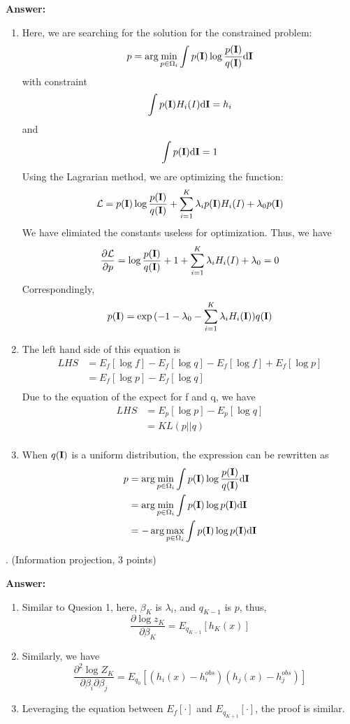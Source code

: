 \documentclass[11pt]{article}
\newcommand{\I}{{\bf I}}
\begin{document}
\textbf{Answer:}
\begin{enumerate}
    \item 
    Here, we are searching for the solution for the constrained problem:
    $$
    p = \arg\min_{p\in\Omega_i}\int p(\I)\log \frac{p(\I)}{q(\I)}\mathrm{d}\I
    $$
    with constraint
    $$
    \int p(\I)H_i(I)\mathrm{d}\I = h_i
    $$
    and
    $$
    \int p(\I)\mathrm{d}\I = 1
    $$
    Using the Lagrarian method, we are optimizing the function:
    $$
    \mathcal{L} = p(\I)\log \frac{p(\I)}{q(\I)} + \sum_{i=1}^{K}\lambda_i p(\I)H_i(I) + \lambda_0 p(\I)
    $$
    We have elimiated the constants useless for optimization.
    Thus, we have
    $$
    \frac{\partial \mathcal{L}}{\partial p} = \log \frac{p(\I)}{q(\I)} + 1 + \sum_{i=1}^{K}\lambda_i H_i(I) + \lambda_0 = 0
    $$
    Correspondingly,
    $$
    p(\I) = \exp{(-1-\lambda_0-\sum_{i = 1}^{K}\lambda_i H_i(\I))}q(\I)
    $$
    \item 
    The left hand side of this equation is
    $$
    \begin{aligned}
    LHS &= E_f[\log f] - E_f[\log q] - E_f[\log f] + E_f[\log p] \\
        &= E_f[\log p] - E_f[\log q] \\
    \end{aligned}
    $$
    Due to the equation of the expect for f and q, we have
    $$
    \begin{aligned}
        LHS &= E_p[\log p] - E_p[\log q] \\
            &= KL(p||q) \\
    \end{aligned}
    $$
    \item When $q(\I)$ is a uniform distribution, the expression can be rewritten as
    $$
    \begin{aligned}
    p &= \arg\min_{p\in\Omega_i}\int p(\I)\log \frac{p(\I)}{q(\I)}\mathrm{d}\I \\
      &= \arg\min_{p\in\Omega_i}\int p(\I)\log {p(\I)}\mathrm{d}\I \\
      &= -\arg\max_{p\in\Omega_i}\int p(\I)\log {p(\I)}\mathrm{d}\I \\
    \end{aligned}
    $$
\end{enumerate}

. (Information projection, 3 points)

\textbf{Answer:}
\begin{enumerate}
    \item 
    Similar to Quesion 1, here, $\beta_K$ is $\lambda_i$, and $q_{K-1}$ is $p$, thus,
    $$
    \frac{\partial \log z_K}{\partial \beta_K} = E_{q_{K-1}}[h_K(x)]
    $$
    \item 
    Similarly, we have
    $$
    \frac{\partial^2\log Z_K}{\partial\beta_i\partial\beta_j} = E_{q_0}[(h_i(x) - h^{obs}_i)(h_j(x) - h^{obs}_j)]
    $$
    \item Leveraging the equation between $E_f[\cdot]$ and $E_{q_{K+1}}[\cdot]$, the proof is similar.
\end{enumerate}
\end{document}
